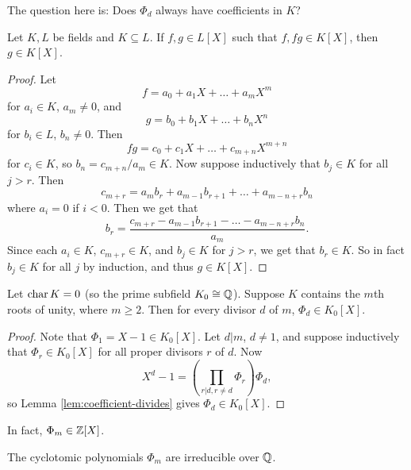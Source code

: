 \begin{remark}
  The question here is: Does $\Phi_d$ always have
  coefficients in $K$?
\end{remark}

\begin{lemma}
  \label{lem:coefficient-divides}
  Let $K, L$ be fields and $K \subseteq L$. If
  $f, g \in L[X]$ such that $f, fg \in K[X]$, then
  $g \in K[X]$.
\end{lemma}

\begin{proof}
  Let
  \[
    f = a_0 + a_1 X + \dots + a_m X^m
  \]
  for $a_i \in K$, $a_m \ne 0$, and
  \[
    g = b_0 + b_1 X + \dots + b_n X^n
  \]
  for $b_i \in L$, $b_n \ne 0$. Then
  \[
    fg = c_0 + c_1 X + \dots + c_{m + n} X^{m + n}
  \]
  for $c_i \in K$, so $b_n = c_{m + n} / a_m \in K$.
  Now suppose inductively that $b_j \in K$ for all
  $j > r$. Then
  \[
    c_{m + r} = a_m b_r + a_{m - 1} b_{r + 1} + \dots + a_{m - n + r} b_{n}
  \]
  where $a_i = 0$ if $i < 0$. Then we get that
  \[
    b_r = \frac{c_{m + r} - a_{m - 1} b_{r + 1} - \dots - a_{m - n + r} b_{n}}{a_m}.
  \]
  Since each $a_i \in K$, $c_{m + r} \in K$, and
  $b_j \in K$ for $j > r$, we get that $b_r \in K$.
  So in fact $b_j \in K$ for all $j$ by induction, and
  thus $g \in K[X]$.
\end{proof}

\begin{theorem}
  Let $\operatorname{char} K = 0$ (so the prime subfield
  $K_0 \cong \mathbb{Q}$). Suppose $K$ contains the $m$th roots of
  unity, where $m \ge 2$. Then for every divisor $d$
  of $m$, $\Phi_d \in K_0[X]$.
\end{theorem}

\begin{proof}
  Note that $\Phi_1 = X - 1 \in K_0[X]$. Let $d | m$,
  $d \ne 1$, and suppose inductively that
  $\Phi_r \in K_0[X]$ for all proper divisors $r$ of
  $d$. Now
  \[
    X^d - 1 = \left(\prod_{r | d, r \ne d} \Phi_r\right) \Phi_d,
  \]
  so Lemma \ref{lem:coefficient-divides} gives
  $\Phi_d \in K_0[X]$.
\end{proof}

\begin{remark}
  In fact, $\Phi_m \in \mathbb{Z}[X]$.
\end{remark}

\begin{theorem}
  The cyclotomic polynomials $\Phi_m$ are irreducible
  over $\mathbb{Q}$.
\end{theorem}

